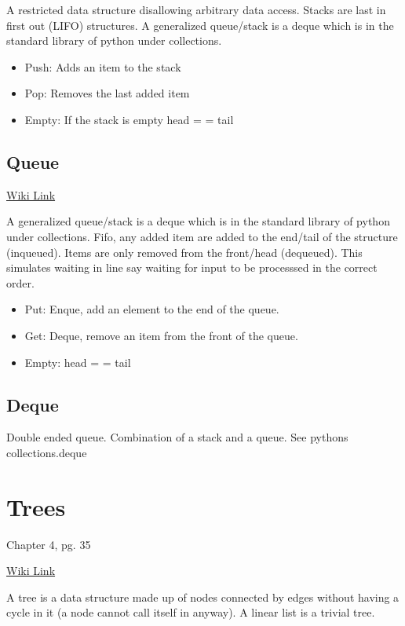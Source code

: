 A restricted data structure disallowing arbitrary data access. Stacks are last in first out (LIFO) structures. A generalized queue/stack is a deque which is in the standard library of python under collections.
\begin{itemize}
	\item Push: Adds an item to the stack
	\item Pop: Removes the last added item
	\item Empty: If the stack is empty \ra head = = tail
\end{itemize}


\subsection{Queue}
\href{https://en.wikipedia.org/wiki/Queue_(abstract_data_type)}{Wiki Link}

A generalized queue/stack is a deque which is in the standard library of python under collections.
Fifo, any added item are added to the end/tail of the structure (inqueued). Items are only removed from the front/head (dequeued). This simulates waiting in line say waiting for input to be processsed in the correct order. 

\begin{itemize}
	\item Put: Enque, add an element to the end of the queue.
	\item Get: Deque, remove an item from the front of the queue.
	\item Empty: head = = tail
\end{itemize}

\subsection{Deque}
Double ended queue. Combination of a stack and a queue. 
See pythons collections.deque


\section{Trees}
	Chapter 4, pg. 35

	\href{https://en.wikipedia.org/wiki/Tree_(data_structure)}{Wiki Link}
	
	A tree is a data structure made up of nodes connected by edges without having a cycle in it (a node cannot call itself in anyway). A linear list is a trivial tree.


